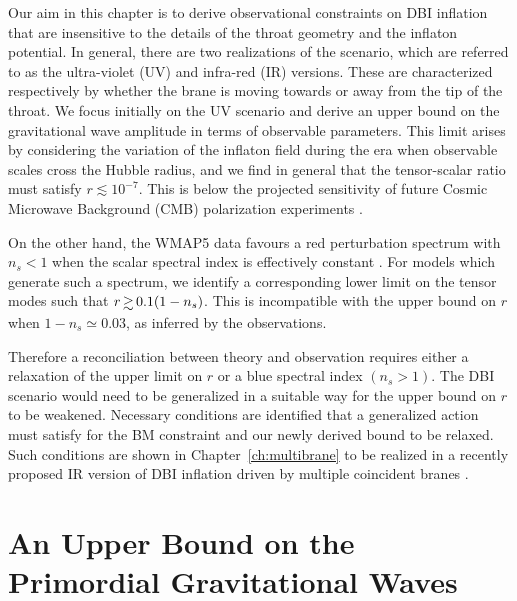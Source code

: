 Our aim in this chapter is to derive observational constraints on DBI inflation
that are 
insensitive to the details of the throat geometry and the inflaton potential. 
In general, there are two realizations of the scenario, 
which are referred to as the ultra-violet (UV) and infra-red (IR) 
versions. These are characterized respectively by whether the brane is 
moving towards or away from the tip of the throat. 
We focus initially on the UV scenario 
and derive an upper bound on 
the gravitational wave amplitude in terms of observable 
parameters. This limit arises by considering 
the variation of the inflaton field during the era when 
observable scales cross the Hubble radius, and 
we find in general that the tensor-scalar ratio must satisfy 
$r \lesssim 10^{-7}$. This 
is below the projected sensitivity of future Cosmic Microwave Background (CMB) polarization 
experiments \cite{Baumann:2008aq,vpj}. 

On the other hand, the WMAP5 data 
favours a red perturbation spectrum with 
$n_s<1$ when  
the scalar spectral index is effectively constant \cite{Komatsu:2008hk}. 
For models which generate such a spectrum, 
we identify a corresponding lower limit on the 
tensor modes such that $r \, \gsim \, 0.1 (1-n_s)$. 
This is incompatible with the upper bound 
on $r$ when $1-n_s \simeq 0.03$, as inferred
by the observations. 

Therefore a reconciliation between theory and observation 
requires either a relaxation of the upper limit on $r$ or a blue 
spectral index $(n_s >1)$. The DBI scenario would need 
to be generalized in a suitable way for the upper bound on $r$
to be weakened. Necessary conditions are identified that a 
generalized action must satisfy for the BM constraint and our newly derived
bound to be relaxed. 
Such conditions are shown in Chapter~\ref{ch:multibrane} to be
realized in a recently proposed IR version of DBI inflation driven
by multiple coincident branes \cite{thomasward}. 

% 
% 
\section{An Upper Bound on the Primordial Gravitational Waves}
% 
\label{sec:upper-dbi}
%

